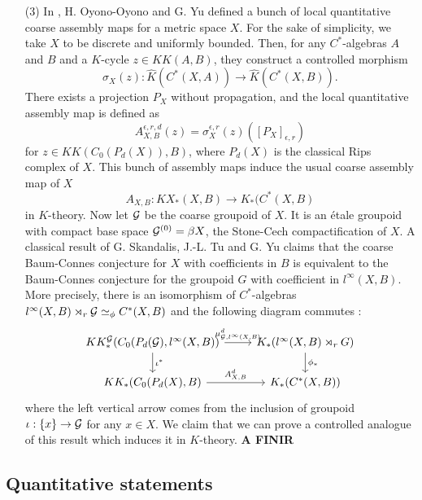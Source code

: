 \begin{itemize}
\item[(3)] In \cite{OY3}, H. Oyono-Oyono and G. Yu defined a bunch of local quantitative coarse assembly maps for a metric space $X$. For the sake of simplicity, we take $X$ to be discrete and uniformly bounded. Then, for any $C^*$-algebras $A$ and $B$ and a $K$-cycle $z\in KK(A,B)$, they construct a controlled morphism
\[\sigma_X(z) : \hat K(C^*(X,A))\rightarrow \hat K(C^*(X,B)).\]
There exists a projection $P_X$ without propagation, and the local quantitative assembly map is defined as 
\[A_{X,B}^{\epsilon,r,d}(z)=\sigma_X^{\epsilon,r}(z)([P_X]_{\epsilon,r})\] for $z\in KK(C_0(P_d(X)),B)$, where $P_d(X)$ is the classical Rips complex of $X$. This bunch of assembly maps induce the usual coarse assembly map of $X$ 
\[A_{X,B} : KX_*(X,B)\rightarrow K_*(C^*(X,B)\]
in $K$-theory. Now let $\mathcal G$ be the coarse groupoid of $X$. It is an étale groupoid with compact base space $\mathcal G^{(0)}=\beta X$, the Stone-Cech compactification of $X$. A classical result of G. Skandalis, J.-L. Tu and G. Yu \cite{SkTuYu} claims that the coarse Baum-Connes conjecture for $X$ with coefficients in $B$ is equivalent to the Baum-Connes conjecture for the groupoid $G$ with coefficient in $l^\infty(X,B)$. More precisely, there is an isomorphism of $C^*$-algebras $l^\infty(X,B)\rtimes_r \mathcal G \simeq_\phi C^*(X,B)$ and the following diagram commutes :
\[\begin{tikzcd}
KK_*^\G(C_0(P_d(\G),l^\infty(X,B)) \arrow{r}{\mu_{\G,l^\infty(X,B)}^d}\arrow{d}{\iota^*}& K_*(l^\infty(X,B)\rtimes_r G)\arrow{d}{\phi_*}\\
KK_*(C_0(P_d(X),B) \arrow{r}{A_{X,B}^d}& K_*(C^*(X,B))
\end{tikzcd}\]
where the left vertical arrow comes from the inclusion of groupoid $\iota :\{x\}\rightarrow \mathcal G$ for any $x\in X$. We claim that we can prove a controlled analogue of this result which induces it in $K$-theory. \textbf{A FINIR} 
\end{itemize}

\subsection{Quantitative statements}

